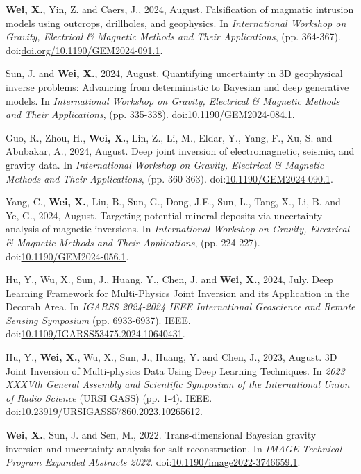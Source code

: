 \documentclass[11pt, a4paper]{article}
\newcommand{\LastName}{Wei}
\newcommand{\Initials}{X}
\newcommand{\Wei}{\textbf{\LastName, \Initials.}}  %
\newcommand{\DOI}[1]{doi:\href{https://doi.org/#1}{#1}}
\begin{document}
\begin{etaremune}	
	\item 	
	\Wei, Yin, Z. and Caers, J., 2024, August. Falsification of magmatic intrusion models using outcrops, drillholes, and geophysics. In \emph{International Workshop on Gravity, Electrical \& Magnetic Methods and Their Applications}, (pp. 364-367). \DOI{doi.org/10.1190/GEM2024-091.1}.

	\item 	
	Sun, J. and \Wei, 2024, August. Quantifying uncertainty in 3D geophysical inverse problems: Advancing from deterministic to Bayesian and deep generative models. In \emph{International Workshop on Gravity, Electrical \& Magnetic Methods and Their Applications}, (pp. 335-338). \DOI{10.1190/GEM2024-084.1}.

	\item 
	Guo, R., Zhou, H., \Wei, Lin, Z., Li, M., Eldar, Y., Yang, F., Xu, S. and Abubakar, A., 2024, August. Deep joint inversion of electromagnetic, seismic, and gravity data. In \emph{International Workshop on Gravity, Electrical \& Magnetic Methods and Their Applications}, (pp. 360-363). \DOI{10.1190/GEM2024-090.1}.
	
	\item 
	Yang, C., \Wei, Liu, B., Sun, G., Dong, J.E., Sun, L., Tang, X., Li, B. and Ye, G., 2024, August. Targeting potential mineral deposits via uncertainty analysis of magnetic inversions. In \emph{International Workshop on Gravity, Electrical \& Magnetic Methods and Their Applications}, (pp. 224-227). \DOI{10.1190/GEM2024-056.1}.
	
	\item 
	Hu, Y., Wu, X., Sun, J., Huang, Y., Chen, J. and \Wei, 2024, July. Deep Learning Framework for Multi-Physics Joint Inversion and its Application in the Decorah Area. In \emph{IGARSS 2024-2024 IEEE International Geoscience and Remote Sensing Symposium} (pp. 6933-6937). IEEE. \DOI{10.1109/IGARSS53475.2024.10640431}.
	
	\item 
	Hu, Y., \Wei, Wu, X., Sun, J., Huang, Y. and Chen, J., 2023, August. 3D Joint Inversion of Multi-physics Data Using Deep Learning Techniques. In \emph{2023 XXXVth General Assembly and Scientific Symposium of the International Union of Radio Science} (URSI GASS) (pp. 1-4). IEEE. \DOI{10.23919/URSIGASS57860.2023.10265612}.
	
	\item
	\Wei, Sun, J. and Sen, M., 2022. Trans-dimensional Bayesian gravity inversion and uncertainty analysis for salt reconstruction. In \emph{IMAGE Technical Program Expanded Abstracts 2022}.  \DOI{10.1190/image2022-3746659.1}.


\end{etaremune}
\end{document}
